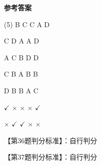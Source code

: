 \documentclass[11pt, a4paper]{article}
\begin{document}
\begin{center}
    \Huge \textbf{参考答案}
\end{center}

    \begin{tasks}[label=\arabic*. , label-width=14pt](5)
        \task B
        \task C
        \task C
        \task A
        \task D

        \task C
        \task D
        \task A
        \task A
        \task D

        \task A
        \task C
        \task B
        \task D
        \task D

        \task C
        \task B
        \task A
        \task B
        \task B

        \task D
        \task B
        \task B
        \task A
        \task C

        \task $\checkmark$
        \task $\times$
        \task $\times$
        \task $\times$
        \task $\checkmark$

        \task $\times$
        \task $\checkmark$
        \task $\checkmark$
        \task $\times$
        \task $\times$
    \end{tasks}

    【第36题判分标准】：自行判分

    【第37题判分标准】：自行判分
\end{document}
